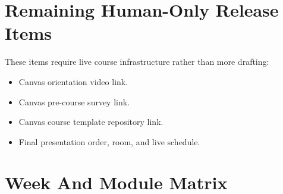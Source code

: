 \documentclass[
  letterpaper,
  DIV=11,
  numbers=noendperiod,
  oneside]{scrreprt}
\providecommand{\tightlist}{%
  \setlength{\itemsep}{0pt}\setlength{\parskip}{0pt}}
\begin{document}
\section{Remaining Human-Only Release
Items}\label{remaining-human-only-release-items}

These items require live course infrastructure rather than more
drafting:

\begin{itemize}
\tightlist
\item
  Canvas orientation video link.
\item
  Canvas pre-course survey link.
\item
  Canvas course template repository link.
\item
  Final presentation order, room, and live schedule.
\end{itemize}

\section{Week And Module Matrix}\label{week-and-module-matrix}
\end{document}

